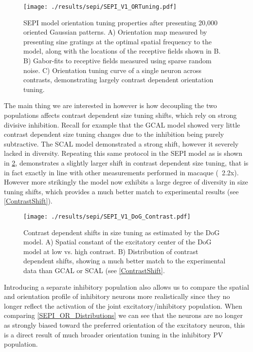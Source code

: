 \begin{figure}
	\centering
    \texttt{[image: ./results/sepi/SEPI\_V1\_ORTuning.pdf]}
	\caption{SEPI model orientation tuning properties after presenting
      20,000 oriented Gaussian patterns. A) Orientation map measured
      by presenting sine gratings at the optimal spatial frequency to
      the model, along with the locations of the receptive fields
      shown in B. B) Gabor-fits to receptive fields measured using
      sparse random noise. C) Orientation tuning curve of a single
      neuron across contrasts, demonstrating largely contrast
      dependent orientation tuning.}
	\label{SEPIORTuning}
\end{figure}

The main thing we are interested in however is how decoupling the two
populations affects contrast dependent size tuning shifts, which rely
on strong divisive inhibition. Recall for example that the GCAL model
showed very little contrast dependent size tuning changes due to the
inhibition being purely subtractive. The SCAL model demonstrated a
strong shift, however it severely lacked in diversity. Repeating this
same protocol in the SEPI model as is shown in
\ref{SEPI_DoG_Contrast}, demonstrates a slightly larger shift in
contrast dependent size tuning, that is in fact exactly in line with
other measurements performed in macaque (~2.2x). However more
strikingly the model now exhibits a large degree of diversity in size
tuning shifts, which provides a much better match to experimental
results (see \ref{ContrastShift}).

\begin{figure}
	\centering
        \texttt{[image: ./results/sepi/SEPI\_V1\_DoG\_Contrast.pdf]}
	\caption{Contrast dependent shifts in size tuning as estimated by
      the DoG model. A) Spatial constant of the excitatory center of
      the DoG model at low vs. high contrast. B) Distribution of
      contrast dependent shifts, showing a much better match to the
      experimental data than GCAL or SCAL (see \ref{ContrastShift}.}
	\label{SEPI_DoG_Contrast}
\end{figure}

Introducing a separate inhibitory population also allows us to compare
the spatial and orientation profile of inhibitory neurons more
realistically since they no longer reflect the activation of the joint
excitatory/inhibitory population. When comparing
\ref{SEPI_OR_Distributions} we can see that the neurons are no longer
as strongly biased toward the preferred orientation of the excitatory
neuron, this is a direct result of much broader orientation tuning in
the inhibitory PV population.

